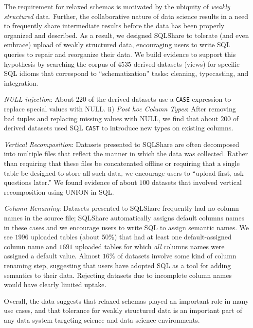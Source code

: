 \documentclass{sig-alternate}
\newcommand{\note}[2]{{\color{#1} {#2}}}
\newcommand{\reviewone}[1]{\note{black}{#1}}
\newcommand{\sqlshare}{SQLShare}
\begin{document}
\reviewone{The requirement for relaxed schemas is motivated by the ubiquity of \emph{weakly structured} data. Further, the collaborative nature of data science results in a need to frequently share intermediate results before the data has been properly organized and described.  As a result, we designed \sqlshare{} to tolerate (and even embrace) upload of weakly structured data, encouraging users to write SQL queries to repair and reorganize their data.
We build evidence to support this hypothesis by searching the corpus of $4535$ derived datasets (views) for specific SQL idioms that correspond to ``schematization'' tasks: cleaning, typecasting, and integration.

\emph{NULL injection}: About $220$ of the derived datasets use a \texttt{CASE} expression to replace special values with NULL. ii) \emph{Post hoc Column Types}: After removing bad tuples and replacing missing values with NULL, we find that about $200$ of derived datasets used SQL \texttt{CAST} to introduce new types on existing columns. 

\emph{Vertical Recomposition}: Datasets presented to \sqlshare{} are often decomposed into multiple files that reflect the manner in which the data was collected.
Rather than requiring that these files be concatenated offline or requiring that a single table be designed to store all such data, we encourage users to ``upload first, ask questions later.''  We found evidence of about $100$ datasets that involved vertical recomposition using UNION in SQL.

\emph{Column Renaming}: Datasets presented to \sqlshare{} frequently had no column names in the source file; \sqlshare{} automatically assigns default columns names in these cases and we encourage users to write SQL to assign semantic names.  We see $1996$ uploaded tables (about 50\%) that had at least one default-assigned column name and $1691$ uploaded tables for which \emph{all} columns names were assigned a default value. Almost $16\%$ of datasets involve some kind of column renaming step, suggesting that users have adopted SQL as a tool for adding semantics to their data. Rejecting datasets due to incomplete column names would have clearly limited uptake.

Overall, the data suggests that relaxed schemas played an important role in many use cases, and that tolerance for weakly structured data is an important part of any data system targeting science and data science environments.}
\end{document}
